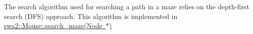 The search algorithm used for searching a path in a maze relies on the depth-\/first search (D\+FS) approach. This algorithm is implemented in \mbox{\hyperlink{classrwa2_1_1_mouse_a12fb73a212e776342b17b6e35527b6e0}{rwa2\+::\+Mouse\+::search\+\_\+maze(\+Node $\ast$)}} 